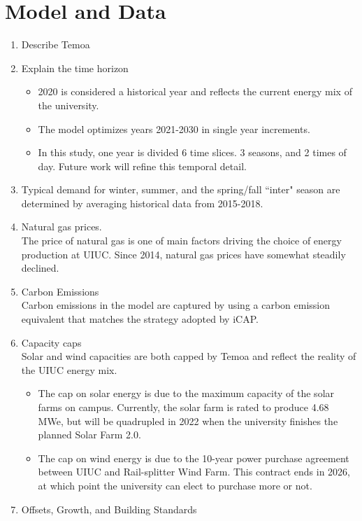 \section{Model and Data}

\begin{enumerate}
  \item Describe Temoa
  \item Explain the time horizon
  \begin{itemize}
    \item 2020 is considered a historical year and reflects the current energy
    mix of the university.
    \item The model optimizes years 2021-2030 in single year increments.
    \item In this study, one year is divided 6 time slices. 3 seasons, and 2 times
    of day. Future work will refine this temporal detail.
  \end{itemize}
  \item Typical demand for winter, summer, and the spring/fall ``inter" season
  are determined by averaging historical data from 2015-2018.
  \item Natural gas prices.\\
  The price of natural gas is one of main factors driving the choice of energy
  production at UIUC. Since 2014, natural gas prices have somewhat steadily declined.
  \item Carbon Emissions \\
  Carbon emissions in the model are captured by using a carbon emission equivalent
  that matches the strategy adopted by iCAP.
  \item Capacity caps\\
  Solar and wind capacities are both capped by Temoa and reflect the reality of
  the UIUC energy mix.
  \begin{itemize}
    \item The cap on solar energy is due to the maximum capacity of the solar
    farms on campus. Currently, the solar farm is rated to produce 4.68 MWe, but
    will be quadrupled in 2022 when the university finishes the planned Solar Farm 2.0.
    \item The cap on wind energy is due to the 10-year power purchase agreement
    between UIUC and Rail-splitter Wind Farm. This contract ends in 2026, at
    which point the university can elect to purchase more or not.
  \end{itemize}
  \item Offsets, Growth, and Building Standards \\

\end{enumerate}
